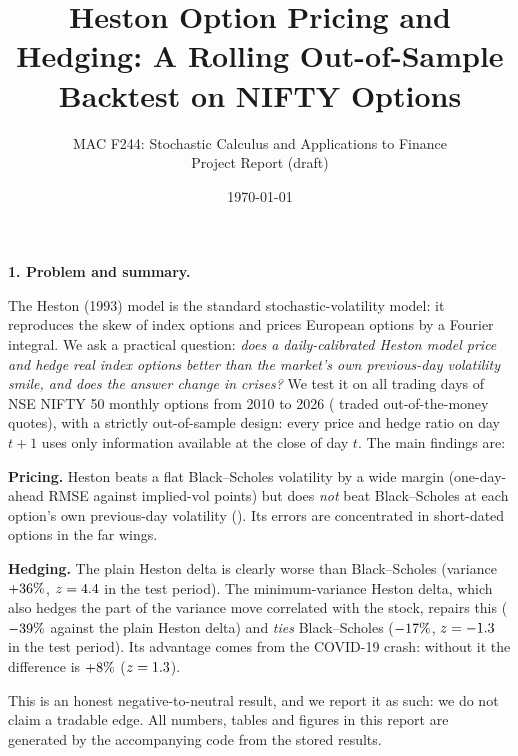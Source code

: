 \documentclass[10pt,leqno]{amsart}
\newcommand{\heading}[1]{\medskip\noindent\textbf{#1}\par}
\begin{document}
\title{Heston Option Pricing and Hedging: A Rolling Out-of-Sample Backtest on NIFTY Options}
\author{MAC F244: Stochastic Calculus and Applications to Finance \\ Project Report (draft)}
\date{\today}
\maketitle
\vspace{-1.5em}

\let\thefootnote\relax
{}

\bigskip

\heading{1. Problem and summary.}
\noindent The Heston (1993) model is the standard stochastic-volatility model: it
reproduces the skew of index options and prices European options by a Fourier
integral. We ask a practical question: \emph{does a daily-calibrated Heston model
price and hedge real index options better than the market's own previous-day
volatility smile, and does the answer change in crises?} We test it on all
\NDays{} trading days of NSE NIFTY 50 monthly options from 2010 to 2026
(\NQuotes{} traded out-of-the-money quotes), with a strictly out-of-sample design:
every price and hedge ratio on day $t+1$ uses only information available at the close of day $t$.
The main findings are:
\begin{compactitem}
\item \textbf{Pricing.} Heston beats a flat Black--Scholes volatility by a wide margin
(one-day-ahead RMSE \PriceHestonAll{} against \PriceBSAtmAll{} implied-vol points) but does \emph{not} beat
Black--Scholes at each option's own previous-day volatility (\PriceBSOwnAll{}). Its errors are concentrated in short-dated options in the far wings.
\item \textbf{Hedging.} The plain Heston delta is clearly worse than Black--Scholes
(variance $+36\%$, $z=4.4$ in the test period). The minimum-variance Heston delta,
which also hedges the part of the variance move correlated with the stock, repairs this
($-39\%$ against the plain Heston delta) and \emph{ties} Black--Scholes
($-17\%$, $z=-1.3$ in the test period). Its advantage comes from the COVID-19 crash:
without it the difference is $+8\%$ ($z=1.3$).
\end{compactitem}
This is an honest negative-to-neutral result, and we report it as such: we do not
claim a tradable edge. All numbers, tables and figures in this report are generated
by the accompanying code from the stored results.
\end{document}
